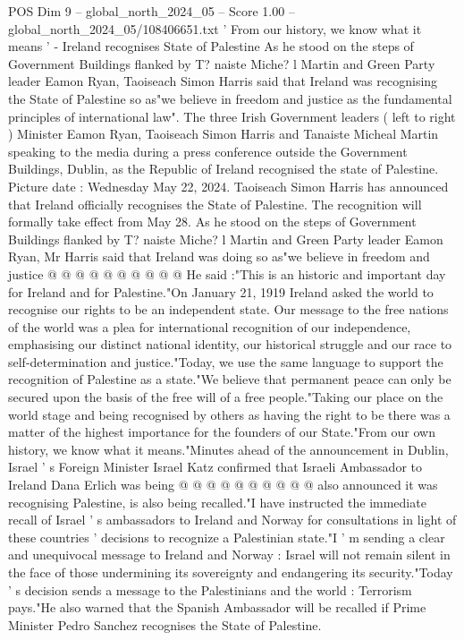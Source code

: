 \begin{textsample}{POS Dim 9 – global\_north\_2024\_05 – Score 1.00 – global\_north\_2024\_05/108406651.txt}  \label{ex:f9_pos_291}
' From our history, we know what it means ' - Ireland recognises State of Palestine As he stood on the steps of Government Buildings flanked by T? naiste Miche? l Martin and Green Party leader Eamon Ryan, Taoiseach Simon Harris said that Ireland was recognising the State of Palestine so as"we believe in freedom and justice as the fundamental principles of international law".
The three Irish Government leaders ( left to right ) Minister Eamon Ryan, Taoiseach Simon Harris and Tanaiste Micheal Martin speaking to the media during a press conference outside the Government Buildings, Dublin, as the Republic of Ireland recognised the state of Palestine.
Picture date : Wednesday May 22, 2024.
Taoiseach Simon Harris has announced that Ireland officially recognises the State of Palestine.
The recognition will formally take effect from May 28.
As he stood on the steps of Government Buildings flanked by T? naiste Miche? l Martin and Green Party leader Eamon Ryan, Mr Harris said that Ireland was doing so as"we believe in freedom and justice @ @ @ @ @ @ @ @ @ @ He said :"This is an historic and important day for Ireland and for Palestine."On January 21, 1919 Ireland asked the world to recognise our rights to be an independent state.
Our message to the free nations of the world was a plea for international recognition of our independence, emphasising our distinct national identity, our historical struggle and our race to self-determination and justice."Today, we use the same language to support the recognition of Palestine as a state."We believe that permanent peace can only be secured upon the basis of the free will of a free people."Taking our place on the world stage and being recognised by others as having the right to be there was a matter of the highest importance for the founders of our State."From our own history, we know what it means."Minutes ahead of the announcement in Dublin, Israel ' s Foreign Minister Israel Katz confirmed that Israeli Ambassador to Ireland Dana Erlich was being @ @ @ @ @ @ @ @ @ @ also announced it was recognising Palestine, is also being recalled."I have instructed the immediate recall of Israel ' s ambassadors to Ireland and Norway for consultations in light of these countries ' decisions to recognize a Palestinian state."I ' m sending a clear and unequivocal message to Ireland and Norway : Israel will not remain silent in the face of those undermining its sovereignty and endangering its security."Today ' s decision sends a message to the Palestinians and the world : Terrorism pays."He also warned that the Spanish Ambassador will be recalled if Prime Minister Pedro Sanchez recognises the State of Palestine.

\end{textsample}
